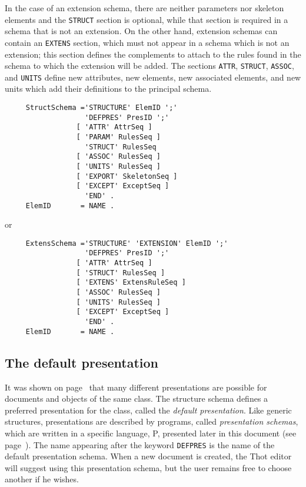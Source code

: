 In the case of an extension schema, there are neither parameters nor
skeleton elements and the {\tt STRUCT} section is optional, while that
section is required in a schema that is not an extension.  On the
other hand, extension schemas can contain an {\tt EXTENS} section,
which must not appear in a schema which is not an extension; this
section defines the complements to attach to the rules found in the
schema to which the extension will be added.  The sections {\tt ATTR},
{\tt STRUCT}, {\tt ASSOC}, and {\tt UNITS} define new attributes, new
elements, new associated elements, and new units which add their
definitions to the principal schema.

\begin{verbatim}
     StructSchema ='STRUCTURE' ElemID ';'
                   'DEFPRES' PresID ';'
                 [ 'ATTR' AttrSeq ]
                 [ 'PARAM' RulesSeq ]
                   'STRUCT' RulesSeq
                 [ 'ASSOC' RulesSeq ]
                 [ 'UNITS' RulesSeq ]
                 [ 'EXPORT' SkeletonSeq ]
                 [ 'EXCEPT' ExceptSeq ]
                   'END' .
     ElemID       = NAME .
\end{verbatim}
or
\begin{verbatim}
     ExtensSchema ='STRUCTURE' 'EXTENSION' ElemID ';'
                   'DEFPRES' PresID ';'
                 [ 'ATTR' AttrSeq ]
                 [ 'STRUCT' RulesSeq ]
                 [ 'EXTENS' ExtensRuleSeq ]
                 [ 'ASSOC' RulesSeq ]
                 [ 'UNITS' RulesSeq ]
                 [ 'EXCEPT' ExceptSeq ]
                   'END' .
     ElemID       = NAME .
\end{verbatim}


\subsection{The default presentation}

It was shown on page~\pageref{presmul} that many different
presentations are possible for documents and objects of the same
class.  The structure schema defines a preferred presentation for the
class, called the {\em default presentation}.  Like generic
structures, presentations are described by programs, called {\em
presentation schemas}, which are written in a specific language, P,
presented later in this document (see page~\pageref{langp}).  The name
appearing after the keyword {\tt DEFPRES} is the name of the default
presentation schema.  When a new document is created, the Thot editor
will suggest using this presentation schema, but the user remains free
to choose another if he wishes.

